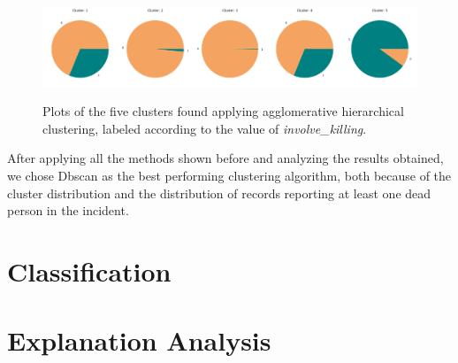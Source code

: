 \documentclass[10pt,a4paper]{report}
\begin{document}
\begin{figure}[h]
	\centering
	\includegraphics[width=0.2\textwidth]{hiera_1}\includegraphics[width=0.2\textwidth]{hiera_2}\includegraphics[width=0.2\textwidth]{hiera_3}\includegraphics[width=0.2\textwidth]{hiera_4}\includegraphics[width=0.2\textwidth]{hiera_5}
	\caption{Plots of the five clusters found applying agglomerative hierarchical clustering, labeled according to the value of \textit{involve\_killing}.}
	\label{hiera_killing}
\end{figure}

After applying all the methods shown before and analyzing the results obtained, we chose Dbscan as the best performing clustering algorithm, both because of the cluster distribution and the  distribution of records reporting at least one dead person in the incident.

\chapter{Classification}

\chapter{Explanation Analysis}
\end{document}

